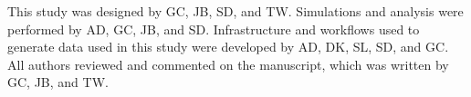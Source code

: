 \documentclass[NETN]{stjour}
\begin{document}
\authorcontributions 
This study was designed by GC, JB, SD, and TW. Simulations and analysis were performed by AD, GC, JB, and SD. Infrastructure and workflows used to generate data used in this study were developed by AD, DK, SL, SD, and GC.  All authors reviewed and commented on the manuscript, which was written by GC, JB, and TW.

\newpage



\end{document}
